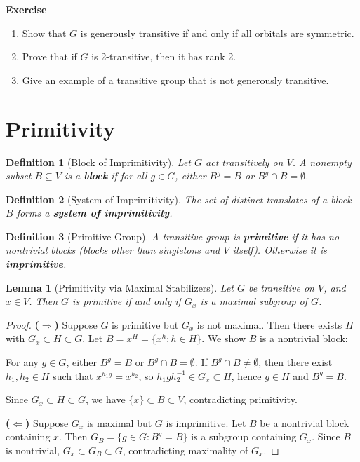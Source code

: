 \documentclass[12pt,a4paper,openany]{book}
\newtheorem{definition}{Definition}[section]
\newtheorem{lemma}{Lemma}[section]
\begin{document}
\bigskip\noindent\textbf{Exercise}\label{ex:orbital-properties}
\begin{enumerate}
\item Show that $G$ is generously transitive if and only if all orbitals are symmetric.
\item Prove that if $G$ is 2-transitive, then it has rank 2.
\item Give an example of a transitive group that is not generously transitive.
\end{enumerate}


\section{Primitivity}



\begin{definition}[Block of Imprimitivity]
Let $G$ act transitively on $V$. A nonempty subset $B \subseteq V$ is a \textbf{block} if for all $g \in G$, either $B^g = B$ or $B^g \cap B = \emptyset$.
\end{definition}

\begin{definition}[System of Imprimitivity]
The set of distinct translates of a block $B$ forms a \textbf{system of imprimitivity}.
\end{definition}

\begin{definition}[Primitive Group]
A transitive group is \textbf{primitive} if it has no nontrivial blocks (blocks other than singletons and $V$ itself). Otherwise it is \textbf{imprimitive}.
\end{definition}

\begin{lemma}[Primitivity via Maximal Stabilizers]\label{lem:primitivity-maximal}
Let $G$ be transitive on $V$, and $x \in V$. Then $G$ is primitive if and only if $G_x$ is a maximal subgroup of $G$.
\end{lemma}

\begin{proof}
\textbf{($\Rightarrow$)} Suppose $G$ is primitive but $G_x$ is not maximal. Then there exists $H$ with $G_x \subset H \subset G$. Let $B = x^H = \{x^h : h \in H\}$. We show $B$ is a nontrivial block:

For any $g \in G$, either $B^g = B$ or $B^g \cap B = \emptyset$. If $B^g \cap B \neq \emptyset$, then there exist $h_1, h_2 \in H$ such that $x^{h_1 g} = x^{h_2}$, so $h_1 g h_2^{-1} \in G_x \subset H$, hence $g \in H$ and $B^g = B$.

Since $G_x \subset H \subset G$, we have $\{x\} \subset B \subset V$, contradicting primitivity.

\textbf{($\Leftarrow$)} Suppose $G_x$ is maximal but $G$ is imprimitive. Let $B$ be a nontrivial block containing $x$. Then $G_B = \{g \in G : B^g = B\}$ is a subgroup containing $G_x$. Since $B$ is nontrivial, $G_x \subset G_B \subset G$, contradicting maximality of $G_x$.
\end{proof}
\end{document}
